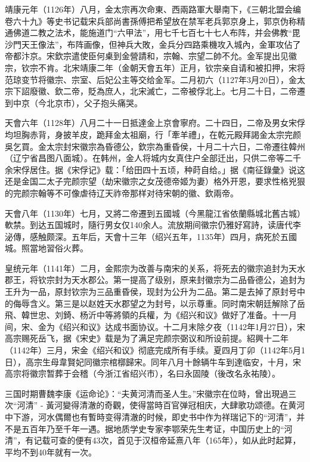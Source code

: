 靖康元年（1126年）八月，金太宗再次命東、西兩路軍大舉南下，《三朝北盟会编卷六十九》等史书记载宋兵部尚書孫傅把希望放在禁军老兵郭京身上，郭京伪称精通佛道二教之法术，能施道门“六甲法”，用七千七百七十七人布阵，并会佛教“毘沙門天王像法”，布阵画像，但神兵大敗，金兵分四路乘機攻入城內，金軍攻佔了帝都汴京。宋欽宗遣使臣何㮚到金營請和，宗翰、宗望二帥不允。金军提出见徽宗，钦宗不肯。北宋靖康二年（金朝天會五年）正月，钦宗亲自请和被扣押，宋将范琼变节将徽宗、宗室、后妃公主等交给金军。二月初六（1127年3月20日），金太宗下詔廢徽、欽二帝，貶為庶人，北宋滅亡，二帝被俘北上。七月二十日，二帝遷到中京（今北京市），父子抱头痛哭。

天會六年（1128年）八月二十一日抵達金上京會寧府。二十四日，二帝及男女宋俘均坦胸赤背，身披羊皮，跪拜金太祖廟，行「牽羊禮」，在乾元殿拜謁金太宗完颜吳乞買。金太宗封宋徽宗為昏德公，欽宗為重昏侯，十月二十六日，二帝遷往韓州（辽宁省昌图八面城）。在韩州，金人将城内女真住户全部迁出，只供二帝等二千余宋俘居住。据《宋俘记》载：「给田四十五顷，种莳自给。」据《南征錄彙》说这还是金国二太子完颜宗望（劫宋徽宗之女茂德帝姬为妻）格外开恩，要求性格兇狠的完颜宗翰等不可像虐待辽天祚帝那样对待宋朝的徽、欽兩帝。

天會八年（1130年）七月，又將二帝遷到五國城（今黑龍江省依蘭縣城北舊古城）軟禁。到达五国城时，隨行男女仅140余人。流放期间徽宗仍雅好寫詩，读唐代李泌傳，感触颇深。五年后，天會十三年（绍兴五年，1135年）四月，病死於五國城。照當地習俗火葬。

皇统元年（1141年）二月，金熙宗为改善与南宋的关系，将死去的徽宗追封为天水郡王，将钦宗封为天水郡公。第一提高了级别，原来封徽宗为二品昏德公，追封为王升为一品，原封钦宗为三品重昏侯，现封为公升为二品。第二是去掉了原封号中的侮辱含义。第三是以赵姓天水郡望之为封号，以示尊重。同时南宋朝廷解除了岳飛、韓世忠、刘錡、杨沂中等將領的兵權，为《绍兴和议》做好了准备。十一月间，宋、金为《绍兴和议》达成书面协议。十二月末除夕夜（1142年1月27日），宋高宗赐死岳飞，据《宋史》载是为了满足完颜宗弼议和所设前提。紹興十二年（1142年）三月，宋金《绍兴和议》彻底完成所有手续。夏四月丁卯（1142年5月1日），高宗生母韋賢妃同徽宗棺槨歸宋。同年八月十餘辆牛车到達临安，十月，宋高宗将徽宗暂葬于会稽（今浙江省绍兴市），名曰永固陵（後改名永祐陵）。

三国时期曹魏李康《运命论》：“夫黄河清而圣人生。”宋徽宗在位時，曾出現過三次“河清” - 黃河變得清澈的奇觀，使得當時百官弹冠相庆，大肆歌功颂德。在黄河中下游，河水偶爾也有暫時变得清澈的时候，即史书中作为祥瑞记下的“河清”，并不是五百年乃至千年一遇。据地质学史专家李鄂荣先生考证，中国历史上的“河清”，有记载可查的便有43次，首见于汉桓帝延熹八年（165年），如从此时起算，平均不到40年就有一次。

